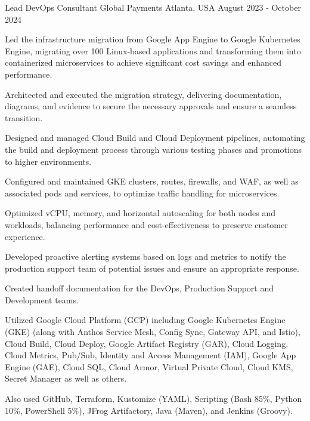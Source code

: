\textcolor{awesome}{\raisebox{0.1\height}{\faBriefcase\thinspace}}


\begin{cventries}

  \cventry
    {Lead DevOps Consultant} %
    {Global Payments} %
    {Atlanta, USA} %
    {August 2023 - October 2024} %
    {
      \begin{cvitems} %
        \item {Led the infrastructure migration from Google App Engine to Google Kubernetes Engine, migrating over 100 Linux-based applications and transforming them into containerized microservices to achieve significant cost savings and enhanced performance.}
        \item {Architected and executed the migration strategy, delivering documentation, diagrams, and evidence to secure the necessary approvals and ensure a seamless transition.}
        \item {Designed and managed Cloud Build and Cloud Deployment pipelines, automating the build and deployment process through various testing phases and promotions to higher environments.}
        \item {Configured and maintained GKE clusters, routes, firewalls, and WAF, as well as associated pods and services, to optimize traffic handling for microservices.}
        \item {Optimized vCPU, memory, and horizontal autoscaling for both nodes and workloads, balancing performance and cost-effectiveness to preserve customer experience.}
        \item {Developed proactive alerting systems based on logs and metrics to notify the production support team of potential issues and ensure an appropriate response.}
        \item {Created handoff documentation for the DevOps, Production Support and Development teams.}
        \item {Utilized Google Cloud Platform (GCP) including Google Kubernetes Engine (GKE) (along with Anthos Service Mesh, Config Sync, Gateway API, and Istio), Cloud Build, Cloud Deploy, Google Artifact Registry (GAR), Cloud Logging, Cloud Metrics, Pub/Sub, Identity and Access Management (IAM), Google App Engine (GAE), Cloud SQL, Cloud Armor, Virtual Private Cloud, Cloud KMS, Secret Manager as well as others.}
        \item {Also used GitHub, Terraform, Kustomize (YAML), Scripting (Bash 85\%, Python 10\%, PowerShell 5\%), JFrog Artifactory, Java (Maven), and Jenkins (Groovy).}
      \end{cvitems}
    }


\end{cventries}
